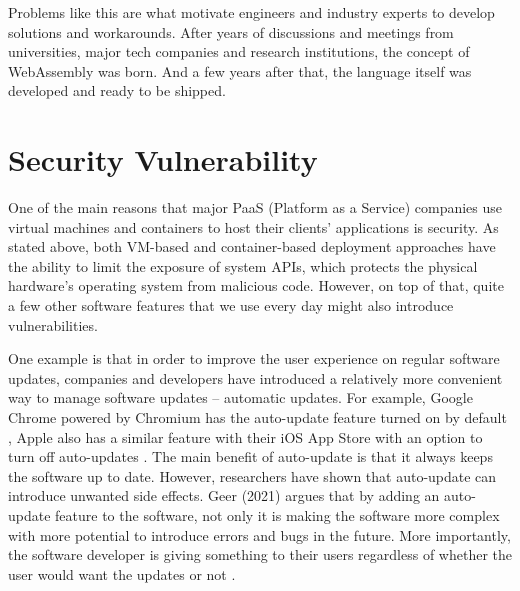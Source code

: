 Problems like this are what motivate engineers and industry experts to develop solutions and workarounds. After years of discussions and meetings from universities, major tech companies and research institutions, the concept of WebAssembly was born. And a few years after that, the language itself was developed and ready to be shipped.

\bigskip
\section{Security Vulnerability}

One of the main reasons that major PaaS (Platform as a Service) companies use virtual machines and containers to host their clients’ applications is security. As stated above, both VM-based and container-based deployment approaches have the ability to limit the exposure of system APIs, which protects the physical hardware’s operating system from malicious code. However, on top of that, quite a few other software features that we use every day might also introduce vulnerabilities.

One example is that in order to improve the user experience on regular software updates, companies and developers have introduced a relatively more convenient way to manage software updates – automatic updates. For example, Google Chrome powered by Chromium has the auto-update feature turned on by default \cite{lit6}, Apple also has a similar feature with their iOS App Store with an option to turn off auto-updates \cite{lit7}. The main benefit of auto-update is that it always keeps the software up to date. However, researchers have shown that auto-update can introduce unwanted side effects. Geer (2021) argues that by adding an auto-update feature to the software, not only it is making the software more complex with more potential to introduce errors and bugs in the future. More importantly, the software developer is giving something to their users regardless of whether the user would want the updates or not \cite{lit8}.

